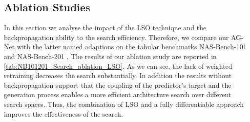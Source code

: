 \documentclass[runningheads]{llncs}
\begin{document}
\begin{table*}[t]
\caption{Ablation: Search results on NAS-Bench-101 and NAS-Bench-201 using AG-Net (mean over 10 trials with a maximal query amount of ).}
\label{tab:NB101201_Search_ablation_LSO}
\scriptsize
\begin{center}
\end{center}
\end{table*}

\subsection{Ablation Studies}\label{sec:ablation_studies}

In this section we analyse the impact of the LSO technique and the backpropagation ability to the search efficiency. Therefore, we compare our AG-Net with the latter named adaptions on the tabular benchmarks NAS-Bench-101 \cite{2019NB101} and NAS-Bench-201 \cite{2020NB201}. The results of our ablation study are reported in \autoref{tab:NB101201_Search_ablation_LSO}.
As we can see, the lack of weighted retraining decreases the search substantially. 
In addition the results without backpropagation support that the coupling of the predictor's target and the generation process enables a more efficient architecture search over different search spaces. Thus, the combination of LSO and a fully differentiable approach improves the effectiveness of the search.
\end{document}
